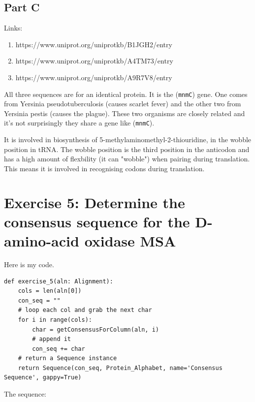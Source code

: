 \documentclass{article} %
\begin{document}
\subsection{Part C}

Links:

\begin{enumerate}
    \item https://www.uniprot.org/uniprotkb/B1JGH2/entry
    \item https://www.uniprot.org/uniprotkb/A4TM73/entry
    \item https://www.uniprot.org/uniprotkb/A9R7V8/entry
\end{enumerate}

All three sequences are for an identical protein. It is the (\verb+mnmC+) gene. One comes from Yersinia pseudotuberculosis (causes scarlet fever) and the other two from Yersinia pestis (causes the plague). These two organisms are closely related and it's not surprisingly they share a gene like (\verb+mnmC+).

It is involved in biosynthesis of 5-methylaminomethyl-2-thiouridine, in the wobble position in tRNA. The wobble position is the third position in the anticodon and has a high amount of flexbility (it can "wobble") when pairing during translation. This means it is involved in recognising codons during translation.

\section{Exercise 5: Determine the consensus sequence for the D-amino-acid oxidase MSA}

Here is my code.

\begin{verbatim}
def exercise_5(aln: Alignment):
    cols = len(aln[0])
    con_seq = ""
    # loop each col and grab the next char
    for i in range(cols):
        char = getConsensusForColumn(aln, i)
        # append it
        con_seq += char
    # return a Sequence instance
    return Sequence(con_seq, Protein_Alphabet, name='Consensus Sequence', gappy=True)
\end{verbatim}

The sequence:
\end{document}
